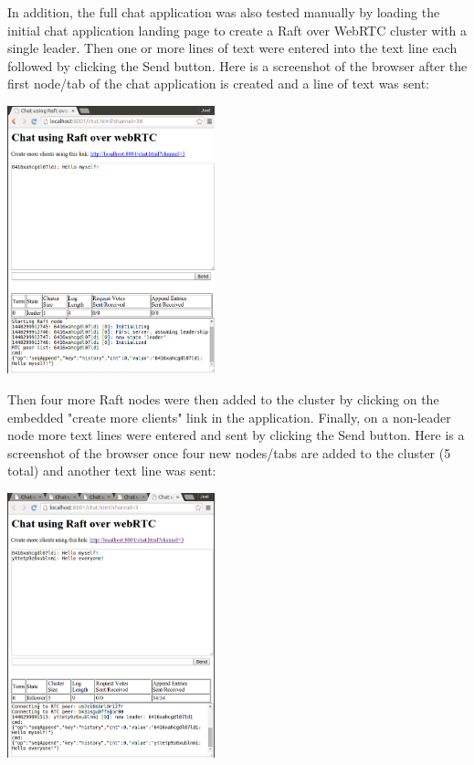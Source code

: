 \documentclass[9pt]{extarticle}
\begin{document}
\begin{multicols}{2}
In addition, the full chat application was also tested manually by
loading the initial chat application landing page to create a Raft
over WebRTC cluster with a single leader. Then one or more lines of
text were entered into the text line each followed by clicking the
Send button.  Here is a screenshot of the browser after the first
node/tab of the chat application is created and a line of text was
sent:

\begin{center}
    \includegraphics[width=0.45\textwidth]{imgs/chat_1a.png}
    \label{fig:browser_chat_1}
\end{center}

Then four more Raft nodes were then added to the cluster by clicking
on the embedded "create more clients" link in the application.
Finally, on a non-leader node more text lines were entered and sent by
clicking the Send button. Here is a screenshot of the browser once
four new nodes/tabs are added to the cluster (5 total) and another
text line was sent:

\begin{center}
    \includegraphics[width=0.45\textwidth]{imgs/chat_5a.png}
    \label{fig:browser_chat_5}
\end{center}


\end{multicols}
\end{document}
